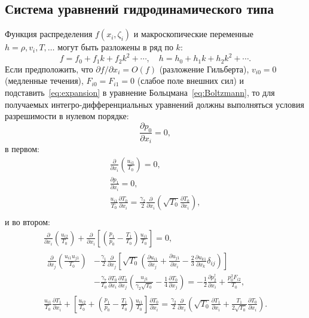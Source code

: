 \documentclass[
aps,%
12pt,%
final,%
notitlepage,%
oneside,%
onecolumn,%
nobibnotes,%
nofootinbib,%
superscriptaddress,%
noshowpacs,%
centertags]%
{revtex4}
\newcommand{\pder}[2][]{\frac{\partial#1}{\partial#2}}
\newcommand{\Pder}[2][]{\partial#1/\partial#2}
\newcommand{\OO}[1]{O\left(#1\right)}
\begin{document}
\subsection{Система уравнений гидродинамического типа}

Функция распределения \(f(x_i,\zeta_i)\) и макроскопические переменные \(h = \rho, v_i, T, \dots\)
могут быть разложены в ряд по \(k\):
\begin{equation}\label{eq:expansion}
    f = f_0 + f_1k + f_2k^2 + \cdots, \quad h = h_0 + h_1k + h_2k^2 + \cdots.
\end{equation}
Если предположить, что \(\Pder[f]{x_i} = \OO{f}\) (разложение Гильберта),
\(v_{i0} = 0\) (медленные течения), \(F_{i0} = F_{i1} = 0\) (слабое поле внешних сил)
и подставить~\eqref{eq:expansion} в уравнение Больцмана~\eqref{eq:Boltzmann},
то для получаемых интегро-дифференциальных уравнений должны выполняться
условия разрешимости в нулевом порядке:
\begin{equation}
    \pder[p_0]{x_i} = 0, \label{eq:asymptotic0_p}
\end{equation}
в первом:
\begin{gather}
    \pder{x_i}\left(\frac{u_{i1}}{T_0}\right) = 0, \label{eq:asymptotic1_u} \\
    \pder[p_1]{x_i} = 0, \label{eq:asymptotic1_p} \\
    \frac{u_{i1}}{T_0}\pder[T_0]{x_i}
        = \frac{\gamma_2}2\pder{x_i}\left(\sqrt{T_0}\pder[T_0]{x_i}\right), \label{eq:asymptotic1_T} \\
\end{gather}
и во втором:
\begin{gather}
    \pder{x_i}\left(\frac{u_{i2}}{T_0}\right)
        + \pder{x_i}\left[\left(\frac{p_1}{p_0}-\frac{T_1}{T_0}\right)\frac{u_{i1}}{T_0}\right] = 0, \label{eq:asymptotic2_u} \\
    \begin{aligned}
    \pder{x_j}\left(\frac{u_{i1}u_{j1}}{T_0}\right)
        &-\frac{\gamma_1}2\pder{x_j}\left[\sqrt{T_0}\left(
            \pder[u_{i1}]{x_j} + \pder[u_{j1}]{x_i} - \frac23\pder[u_{k1}]{x_k}\delta_{ij}
        \right)\right] \\
        &- \frac{\gamma_7}{T_0}\pder[T_0]{x_i}\pder[T_0]{x_j}\left(\frac{u_{j1}}{\gamma_2\sqrt{T_0}} - \frac{1}4\pder[T_0]{x_j}\right)
        = -\frac12\pder[p_2^\dag]{x_i} + \frac{p_0^2 F_{i2}}{T_0},
    \end{aligned} \label{eq:asymptotic2_p} \\
    \frac{u_{i1}}{T_0}\pder[T_1]{x_i}
        + \left[\frac{u_{i2}}{T_0} + \left(\frac{p_1}{p_0}-\frac{T_1}{T_0}\right)\frac{u_{i1}}{T_0}\right]\pder[T_0]{x_i}
        = \frac{\gamma_2}2\pder{x_i}\left(\sqrt{T_0}\pder[T_1]{x_i} + \frac{T_1}{2\sqrt{T_0}}\pder[T_0]{x_i}\right). \label{eq:asymptotic2_T}
\end{gather}
\end{document}
